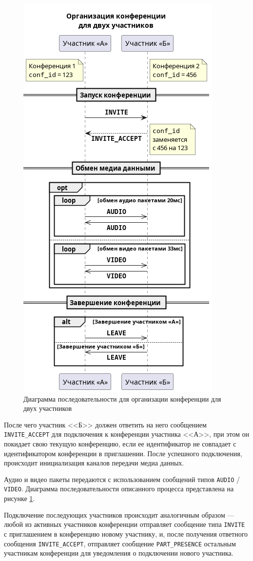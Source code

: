 \begin{figure}[H]
  \centering
  \includegraphics[width=0.5\linewidth]{inc/diag/seq-2/conf-2.png}
  \caption{Диаграмма последовательности для организации конференции для двух участников}
  \label{img:conf-2}
\end{figure}

После чего участник <<Б>> должен ответить на него сообщением \texttt{INVITE\_ACCEPT} для подключения к конференции участника <<А>>, при этом он покидает свою текущую конференцию, если ее идентификатор не совпадает с идентификатором конференции в приглашении.
После успешного подключения, происходит инициализация каналов передачи медиа данных.

Аудио и видео пакеты передаются с использованием сообщений типов \texttt{AUDIO} / \texttt{VIDEO}.
Диаграмма последовательности описанного процесса представлена на рисунке \ref{img:conf-2}.

Подключение последующих участников происходит аналогичным образом --- любой из активных участников конференции отправляет сообщение типа \texttt{INVITE} с приглашением в конференцию новому участнику, и, после получения ответного сообщения \texttt{INVITE\_ACCEPT}, отправляет сообщение \texttt{PART\_PRESENCE} остальным участникам конференции для уведомления о подключении нового участника.

